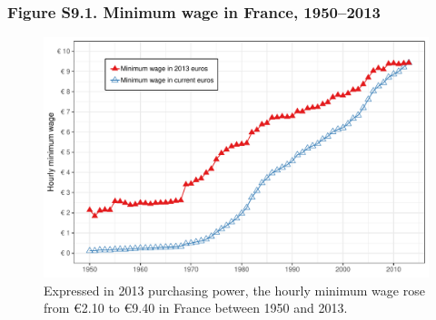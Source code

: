\documentclass[t]{beamer}\usepackage[]{graphicx}\usepackage[]{color}
\makeatletter
\def\maxwidth{ %
  \ifdim\Gin@nat@width>\linewidth
    \linewidth
  \else
    \Gin@nat@width
  \fi
}
\newenvironment{knitrout}{}{} %
\makeatother
\begin{document}
\begin{frame}[label=Figure_S9_1]
\frametitle{Figure S9.1. Minimum wage in France, 1950--2013}
\begin{figure}[t]
\begin{minipage}[b]{\textwidth}
\centering
\begin{knitrout}\footnotesize
{}\color{fgcolor}

{\centering \includegraphics[width=\maxwidth]{figures/color/Figure_S9_1} 

}



\end{knitrout}
\caption{Expressed in 2013 purchasing power, the hourly minimum wage rose from \euro 2.10 to \euro 9.40 in France between 1950 and 2013.}
\end{minipage}
\end{figure}
\end{frame}
\end{document}
